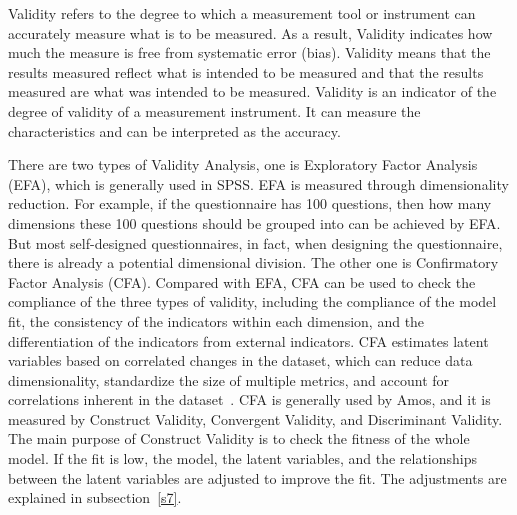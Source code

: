 Validity refers to the degree to which a measurement tool or instrument can accurately measure what is to be measured. As a result, Validity indicates how much the measure is free from systematic error (bias). Validity means that the results measured reflect what is intended to be measured and that the results measured are what was intended to be measured. Validity is an indicator of the degree of validity of a measurement instrument. It can measure the characteristics and can be interpreted as the accuracy. 

There are two types of Validity Analysis, one is Exploratory Factor Analysis (EFA), which is generally used in SPSS. EFA is measured through dimensionality reduction. For example, if the questionnaire has 100 questions, then how many dimensions these 100 questions should be grouped into can be achieved by EFA. But most self-designed questionnaires, in fact, when designing the questionnaire, there is already a potential dimensional division. The other one is Confirmatory Factor Analysis (CFA). Compared with EFA, CFA can be used to check the compliance of the three types of validity, including the compliance of the model fit, the consistency of the indicators within each dimension, and the differentiation of the indicators from external indicators. CFA estimates latent variables based on correlated changes in the dataset, which can reduce data dimensionality, standardize the size of multiple metrics, and account for correlations inherent in the dataset~\cite{ref16}. CFA is generally used by Amos, and it is measured by Construct Validity, Convergent Validity, and Discriminant Validity. The main purpose of Construct Validity is to check the fitness of the whole model. If the fit is low, the model, the latent variables, and the relationships between the latent variables are adjusted to improve the fit. The adjustments are explained in subsection~\ref{s7}. 

